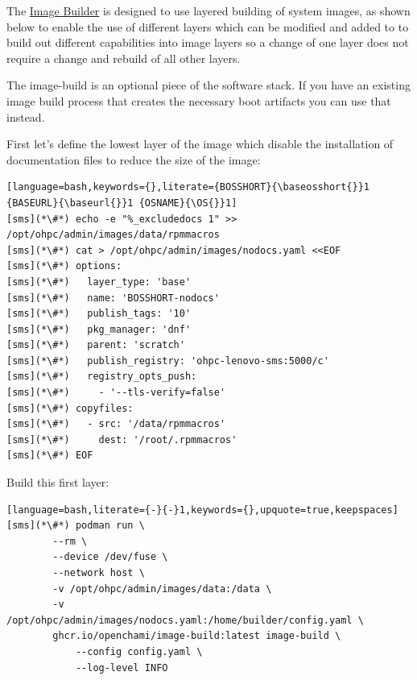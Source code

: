 The \href{https://github.com/OpenCHAMI/image-builder}{Image Builder} is
designed to use layered building of system images, as shown below to enable the
use of different layers which can be modified and added to to build out
different capabilities into image layers so a change of one layer does not
require a change and rebuild of all other layers.

\begin{center}
\begin{tcolorbox}[]
\small The image-build is an optional piece of the \OpenCHAMI{} software stack.
If you have an existing image build process that creates the necessary boot
artifacts you can use that instead.
\end{tcolorbox}
\end{center}

First let's define the lowest layer of the image which disable the installation
of documentation files to reduce the size of the image:

\begin{lstlisting}[language=bash,keywords={},literate={BOSSHORT}{\baseosshort{}}1 {BASEURL}{\baseurl{}}1 {OSNAME}{\OS{}}1]
[sms](*\#*) echo -e "%_excludedocs 1" >> /opt/ohpc/admin/images/data/rpmmacros
[sms](*\#*) cat > /opt/ohpc/admin/images/nodocs.yaml <<EOF
[sms](*\#*) options:
[sms](*\#*)   layer_type: 'base'
[sms](*\#*)   name: 'BOSSHORT-nodocs'
[sms](*\#*)   publish_tags: '10'
[sms](*\#*)   pkg_manager: 'dnf'
[sms](*\#*)   parent: 'scratch'
[sms](*\#*)   publish_registry: 'ohpc-lenovo-sms:5000/c'
[sms](*\#*)   registry_opts_push:
[sms](*\#*)     - '--tls-verify=false'
[sms](*\#*) copyfiles:
[sms](*\#*)   - src: '/data/rpmmacros'
[sms](*\#*)     dest: '/root/.rpmmacros'
[sms](*\#*) EOF
\end{lstlisting}

Build this first layer:

\begin{lstlisting}[language=bash,literate={-}{-}1,keywords={},upquote=true,keepspaces]
[sms](*\#*) podman run \
		--rm \
		--device /dev/fuse \
		--network host \
		-v /opt/ohpc/admin/images/data:/data \
		-v /opt/ohpc/admin/images/nodocs.yaml:/home/builder/config.yaml \
		ghcr.io/openchami/image-build:latest image-build \
			--config config.yaml \
			--log-level INFO
\end{lstlisting}

